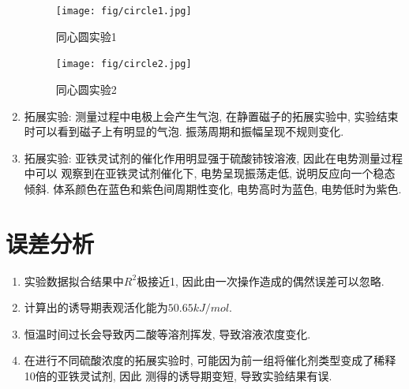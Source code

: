 \documentclass[a4paper]{article}
\begin{document}
\begin{enumerate}
\begin{figure}[!h]
		\centering
		\texttt{[image: fig/circle1.jpg]}\\
		\caption{同心圆实验1}
	\end{figure}
	\begin{figure}[!h]
		\centering
		\texttt{[image: fig/circle2.jpg]}\\
		\caption{同心圆实验2}
	\end{figure}
	\item 拓展实验: 测量过程中电极上会产生气泡, 在静置磁子的拓展实验中,
	实验结束时可以看到磁子上有明显的气泡. 振荡周期和振幅呈现不规则变化.
	\item 拓展实验: 亚铁灵试剂的催化作用明显强于硫酸铈铵溶液, 因此在电势测量过程中可以
	观察到在亚铁灵试剂催化下, 电势呈现振荡走低, 说明反应向一个稳态倾斜. 
	体系颜色在蓝色和紫色间周期性变化, 电势高时为蓝色, 
	电势低时为紫色. 


\end{enumerate}
\section{误差分析}
\begin{enumerate}
	\item 实验数据拟合结果中$R^{2}$极接近1, 
	因此由一次操作造成的偶然误差可以忽略. 
	\item 计算出的诱导期表观活化能为$50.65 kJ/mol$. 
	\item 恒温时间过长会导致丙二酸等溶剂挥发, 导致溶液浓度变化.
	\item 在进行不同硫酸浓度的拓展实验时, 
	可能因为前一组将催化剂类型变成了稀释10倍的亚铁灵试剂, 因此
	测得的诱导期变短, 导致实验结果有误.
\end{enumerate}
\newpage
\end{document}
